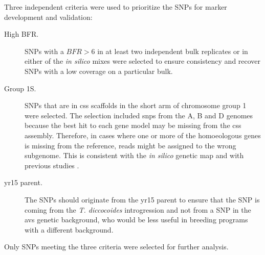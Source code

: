 Three independent criteria were used to prioritize the SNPs for marker development and validation: 

\begin{description}
\item[High BFR.] SNPs with a $BFR>6$ in at least two independent bulk replicates or in either of the \textit{in silico} mixes were selected to ensure consistency and recover SNPs with a low coverage on a particular bulk. 
\item[Group 1S.] SNPs that are in \acrshort{css} scaffolds in the short arm of chromosome group 1 were selected.
The selection included \glspl{snp} from the A, B and D genomes because the best hit to each gene model may be missing from the \gls{css} assembly.
Therefore, in cases where one or more of the homoeologous genes is missing from the reference, reads might be assigned to the wrong subgenome.
This is consistent with the \textit{in silico} genetic map and with previous studies \citep{Murphy2009,Peng2000,Grama1997}.
\item[\acrshort{yr15} parent.] The SNPs should originate from the \acrshort{yr15} parent to ensure that the SNP is coming from the \textit{T. diccocoides} introgression and not from a SNP in the \acrshort{avs} genetic background, who would be less useful in breeding programs with a different background.
\end{description}

Only SNPs meeting the three criteria were selected for further analysis. 

